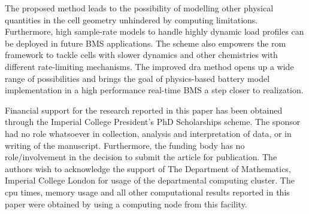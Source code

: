 The proposed method leads to the possibility of modelling other physical
quantities in the cell geometry unhindered by computing limitations.
Furthermore, high sample-rate models to handle highly dynamic load
profiles can be deployed in future BMS applications. The scheme also
empowers the \gls{rom} framework to tackle cells with slower dynamics and
other chemistries with different rate-limiting mechanisms. The improved
\gls{dra} method opens up a wide range of possibilities and brings the goal
of physics-based battery model implementation in a high performance
real-time BMS a step closer to realization.

\begin{acknowledgment}
    Financial support for the research reported in this paper has been
    obtained through the Imperial College President's PhD Scholarships
    scheme. The sponsor had no role whatsoever in collection, analysis
    and interpretation of data, or in writing of the manuscript. Furthermore,
    the funding body has no role/involvement in the decision to submit
    the article for publication. The authors wish to acknowledge the support
    of The Department of Mathematics, Imperial College London for usage
    of the departmental computing cluster. The \gls{cpu} times, memory usage
    and all other computational results reported in this paper were obtained
    by using a computing node from this facility.
\end{acknowledgment}

